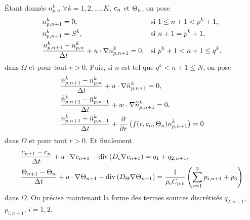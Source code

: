 Étant donnés $n_{p,n}^k$ $\forall k=1, 2, \dots, K$,
$c_n$ et $\Theta_n$, on pose
\begin{align}
  & n_{p,n+1}^k = 0, &&\text{si } 1\leq n + 1 < p^k + 1,\label{eq:splitting-np1-init}\\
  & n_{p,n+1}^k = S^k, &&\text{si } n + 1 = p^k + 1,\\
  & \frac{n_{p,n+1}^k - n_{p,n}^k}{\Delta t} + u\cdot\nabla n_{p,n+1}^k = 0, && \text{si } p^k + 1 < n+1 \leq q^k.\label{eq:splitting-np1-u}
\end{align}
dans $\Omega$ et pour tout $r > 0$. Puis, si $n$ est tel que $q^k < n
+ 1 \leq N$, on pose
\begin{align}
  &\displaystyle\frac{\bar n_{p,n+1}^k - n_{p,n}^k}{\Delta t} +
  u\cdot\nabla \bar n_{p,n+1}^k = 0,\label{eq:splitting-np2-u}\\
  &\displaystyle\frac{\bar{\bar n}_{p,n+1}^k - \bar n_{p,n+1}^k}{\Delta t} +
  w\cdot\nabla \bar{\bar n}_{p,n+1}^k = 0,\label{eq:splitting-np2-w}\\
    &\displaystyle\frac{n_{p,n+1}^k - \bar{\bar n}_{p,n+1}^k}{\Delta t} +
    \displaystyle\frac{\partial}{\partial r}\left( f(r,
      c_n, \Theta_n)n_{p,n+1}^k \right) =
    0\label{eq:splitting-dissolution}
\end{align}
dans $\Omega$ et pour tout $r > 0$. Et finalement
\begin{align}
&\frac{c_{n+1} - c_{n}}{\Delta t} + u\cdot\nabla
c_{n+1} - \mathrm{div}\left( D_c \nabla c_{n+1} \right) = q_1
+ q_{2,n+1},\label{eq:splitting-c} \\
&\frac{\Theta_{n+1} - \Theta_{n}}{\Delta t} + u\cdot\nabla
\Theta_{n+1} - \mathrm{div}\left( D_\Theta \nabla \Theta_{n+1} \right) =
\frac{1}{\rho_\mathrm{e} C_{\mathrm{p,e}}}\left( \sum_{i =
    1}^2p_{i,n+1} + p_3 \right)\label{eq:splitting-t}
\end{align}
dans $\Omega$. On précise maintenant la forme des termes sources
discrétisés $q_{2,n+1}$, $p_{i,n+1}$, $i = 1,2$.


